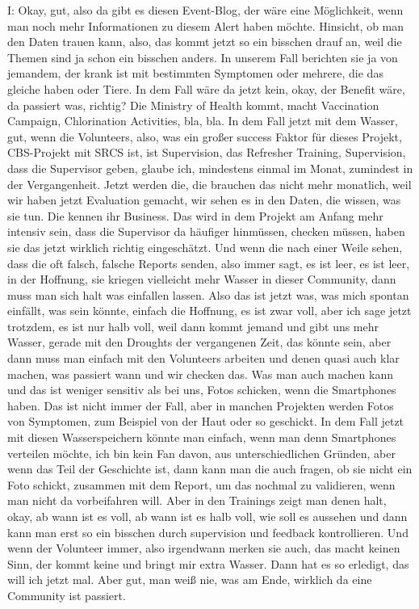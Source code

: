 I: Okay, gut, also da gibt es diesen Event-Blog, der wäre eine Möglichkeit, wenn man noch mehr Informationen zu diesem Alert haben möchte. Hinsicht, ob man den Daten trauen kann, also, das kommt jetzt so ein bisschen drauf an, weil die Themen sind ja schon ein bisschen anders. In unserem Fall berichten sie ja von jemandem, der krank ist mit bestimmten Symptomen oder mehrere, die das gleiche haben oder Tiere. In dem Fall wäre da jetzt kein, okay, der Benefit wäre, da passiert was, richtig? Die Ministry of Health kommt, macht Vaccination Campaign, Chlorination Activities, bla, bla. In dem Fall jetzt mit dem Wasser, gut, wenn die Volunteers, also, was ein großer success Faktor für dieses Projekt, CBS-Projekt mit SRCS ist, ist Supervision, das Refresher Training, Supervision, dass die Supervisor geben, glaube ich, mindestens einmal im Monat, zumindest in der Vergangenheit. Jetzt werden die, die brauchen das nicht mehr monatlich, weil wir haben jetzt Evaluation gemacht, wir sehen es in den Daten, die wissen, was sie tun. Die kennen ihr Business. Das wird in dem Projekt am Anfang mehr intensiv sein, dass die Supervisor da häufiger hinmüssen, checken müssen, haben sie das jetzt wirklich richtig eingeschätzt. Und wenn die nach einer Weile sehen, dass die oft falsch, falsche Reports senden, also immer sagt, es ist leer, es ist leer, in der Hoffnung, sie kriegen vielleicht mehr Wasser in dieser Community, dann muss man sich halt was einfallen lassen. Also das ist jetzt was, was mich spontan einfällt, was sein könnte, einfach die Hoffnung, es ist zwar voll, aber ich sage jetzt trotzdem, es ist nur halb voll, weil dann kommt jemand und gibt uns mehr Wasser, gerade mit den Droughts der vergangenen Zeit, das könnte sein, aber dann muss man einfach mit den Volunteers arbeiten und denen quasi auch klar machen, was passiert wann und wir checken das. Was man auch machen kann und das ist weniger sensitiv als bei uns, Fotos schicken, wenn die Smartphones haben. Das ist nicht immer der Fall, aber in manchen Projekten werden Fotos von Symptomen, zum Beispiel von der Haut oder so geschickt. In dem Fall jetzt mit diesen Wasserspeichern könnte man einfach, wenn man denn Smartphones verteilen möchte, ich bin kein Fan davon, aus unterschiedlichen Gründen, aber wenn das Teil der Geschichte ist, dann kann man die auch fragen, ob sie nicht ein Foto schickt, zusammen mit dem Report, um das nochmal zu validieren, wenn man nicht da vorbeifahren will. Aber in den Trainings zeigt man denen halt, okay, ab wann ist es voll, ab wann ist es halb voll, wie soll es aussehen und dann kann man erst so ein bisschen durch supervision und feedback kontrollieren. Und wenn der Volunteer immer, also irgendwann merken sie auch, das macht keinen Sinn, der kommt keine und bringt mir extra Wasser. Dann hat es so erledigt, das will ich jetzt mal. Aber gut, man weiß nie, was am Ende, wirklich da eine Community ist passiert. 

